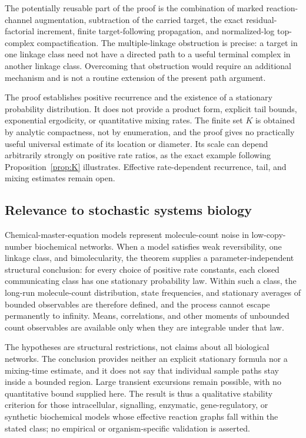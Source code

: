 The potentially reusable part of the proof is the combination of marked
reaction-channel augmentation, subtraction of the carried target, the exact
residual-factorial increment, finite target-following propagation, and
normalized-log top-complex compactification.  The multiple-linkage obstruction
is precise: a target in one linkage class need not have a directed path to a
useful terminal complex in another linkage class.  Overcoming that obstruction
would require an additional mechanism and is not a routine extension of the
present path argument.

The proof establishes positive recurrence and the existence of a stationary
probability distribution.  It does not provide a product form, explicit tail
bounds, exponential ergodicity, or quantitative mixing rates.  The finite set
\(K\) is obtained by analytic compactness, not by enumeration, and the proof
gives no practically useful universal estimate of its location or diameter.
Its scale can depend arbitrarily strongly on positive rate ratios, as the
exact example following Proposition~\ref{prop:K} illustrates.  Effective
rate-dependent recurrence, tail, and mixing estimates remain open.

\subsection*{Relevance to stochastic systems biology}

Chemical-master-equation models represent molecule-count noise in
low-copy-number biochemical networks.  When a model satisfies weak
reversibility, one linkage class, and bimolecularity, the theorem supplies a
parameter-independent structural conclusion: for every choice of positive
rate constants, each closed communicating class has one stationary
probability law.  Within such a class, the long-run molecule-count
distribution, state frequencies, and stationary averages of bounded
observables are therefore defined, and the process cannot escape permanently
to infinity.  Means, correlations, and other moments of unbounded count
observables are available only when they are integrable under that law.

The hypotheses are structural restrictions, not claims about all biological
networks.  The conclusion provides neither an explicit stationary formula nor
a mixing-time estimate, and it does not say that individual sample paths stay
inside a bounded region.  Large transient excursions remain possible, with no
quantitative bound supplied here.  The result is thus a qualitative stability
criterion for those intracellular, signalling, enzymatic, gene-regulatory, or
synthetic biochemical models whose effective reaction graphs fall within the
stated class; no empirical or organism-specific validation is asserted.

